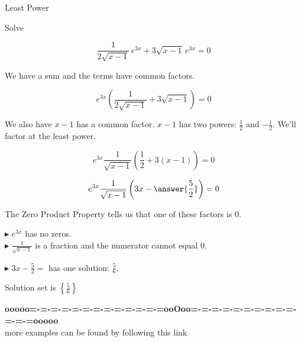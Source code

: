 \documentclass{ximera}
\begin{document}
\begin{example} Least Power



Solve 


\[  \frac{1}{2 \sqrt{x-1}} \, e^{3x}  + 3 \sqrt{x-1} \, e^{3x} = 0  \]


\begin{explanation} 

We have a sum and the terms have common factors.



\[  e^{3x}  \left( \frac{1}{2 \sqrt{x-1}}  + 3 \sqrt{x-1}  \right) = 0  \]



We also have $x-1$ has a common factor.  $x-1$ has two powers: $\tfrac{1}{2}$ and $-\tfrac{1}{2}$.  We'll factor at the least power.


\[  e^{3x}  \frac{1}{\sqrt{x-1}}   \left( \frac{1}{2}  + 3 (x-1)  \right) = 0 \]

\[  e^{3x}  \frac{1}{\sqrt{x-1}}   \left( 3x - \answer{\frac{5}{2}}  \right) = 0  \]





The Zero Product Property tells us that one of these factors is $0$.



$\blacktriangleright$   $e^{3x}$ has no zeros. \\


$\blacktriangleright$   $\frac{1}{\sqrt{x-1}}$ is a fraction and the numerator cannot equal $0$.


$\blacktriangleright$  $3x - \frac{5}{2} = $ has one solution:  $\frac{5}{6}$.



Solution set is $\left\{  \frac{5}{6} \right\}$

\end{explanation}
\end{example}

















\begin{center}
\textbf{\textcolor{green!50!black}{ooooo=-=-=-=-=-=-=-=-=-=-=-=-=ooOoo=-=-=-=-=-=-=-=-=-=-=-=-=ooooo}} \\

more examples can be found by following this link\\ 

\end{center}
\end{document}
